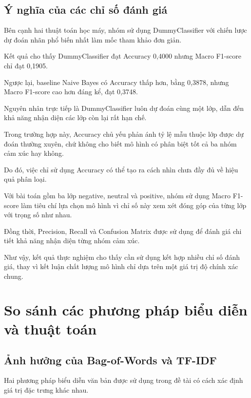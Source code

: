 \subsection{Ý nghĩa của các chỉ số đánh giá}

Bên cạnh hai thuật toán học máy, nhóm sử dụng
DummyClassifier với chiến lược dự đoán nhãn
phổ biến nhất làm mốc tham khảo đơn giản.

Kết quả cho thấy DummyClassifier đạt Accuracy
0,4000 nhưng Macro F1-score chỉ đạt 0,1905.

Ngược lại, baseline Naive Bayes có Accuracy
thấp hơn, bằng 0,3878, nhưng Macro F1-score
cao hơn đáng kể, đạt 0,3748.

Nguyên nhân trực tiếp là DummyClassifier
luôn dự đoán cùng một lớp, dẫn đến khả năng
nhận diện các lớp còn lại rất hạn chế.

Trong trường hợp này, Accuracy chủ yếu phản
ánh tỷ lệ mẫu thuộc lớp được dự đoán thường xuyên,
chứ không cho biết mô hình có phân biệt tốt
cả ba nhóm cảm xúc hay không.

Do đó, việc chỉ sử dụng Accuracy có thể tạo
ra cách nhìn chưa đầy đủ về hiệu quả phân loại.

Với bài toán gồm ba lớp negative, neutral và
positive, nhóm sử dụng Macro F1-score làm tiêu
chí lựa chọn mô hình vì chỉ số này xem xét
đóng góp của từng lớp với trọng số như nhau.

Đồng thời, Precision, Recall và Confusion Matrix
được sử dụng để đánh giá chi tiết khả năng
nhận diện từng nhóm cảm xúc.

Như vậy, kết quả thực nghiệm cho thấy cần sử dụng
kết hợp nhiều chỉ số đánh giá, thay vì kết luận
chất lượng mô hình chỉ dựa trên một giá trị
độ chính xác chung.



\section{So sánh các phương pháp biểu diễn và thuật toán}

\subsection{Ảnh hưởng của Bag-of-Words và TF-IDF}

Hai phương pháp biểu diễn văn bản được sử dụng
trong đề tài có cách xác định giá trị đặc trưng
khác nhau.

